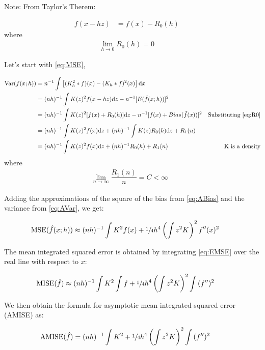 Note: From Taylor's Therem:

\begin{align}
f(x - hz) & = f(x) - R_0(h) && \label{eq:R0}
\end{align}
where 
\begin{align}
\lim_{h \to 0}{R_0(h)} = 0 && \nonumber
\end{align}


Let's start with \autoref{eq:MSE},

\begin{align}
\mbox{Var}(f(x;h)) & = n^{-1} \int{\left[\conv{K_h^2}{f}(x) - \conv{K_h}{f}^2(x)\right]\mathrm{d}x} && \nonumber \\
    & = (nh)^{-1} \int{K(z)^2f(x - hz)\mathrm{d}z} - n^{-1} [E(\hat{f}(x;h))]^2 && \nonumber \\
    & = (nh)^{-1} \int{K(z)^2[f(x) + R_0(h)]\mathrm{d}z} - n^{-1}[f(x) + Bias(\hat{f}(x))]^2 & \text{Substituting \autoref{eq:R0}} & \nonumber \\
    & = (nh)^{-1} \int{K(z)^2f(x)\mathrm{d}z} + (nh)^{-1} \int{K(z)R_0(h)\mathrm{d}z} + R_1(n) && \nonumber \\
    & = (nh)^{-1} \int{K(z)^2f(x)\mathrm{d}z} + (nh)^{-1} R_0(h) + R_1(n) & \text{K is a density} & \label{eq:AVar}
\end{align}
where
\begin{align}
\lim_{n \to \infty} \dfrac{R_1(n)}{n} = C < \infty & \nonumber
\end{align}

Adding the approximations of the square of the bias from \autoref{eq:ABias} and the variance from \autoref{eq:AVar}, we get:

\begin{align}
\mbox{MSE}(\hat{f}(x;h)) & \approx (nh)^{-1} \int{K^2}f(x) + \sfrac{1}{4}h^4\left(\int{z^2K}\right)^2f^{\prime\prime}(x)^2 && \label{eq:EMSE}
\end{align}

The mean integrated squared error is obtained by integrating \autoref{eq:EMSE} over the real line with respect to $x$:

\begin{align}
\mbox{MISE}(\hat{f}) & \approx (nh)^{-1} \int{K^2}\int{f} + \sfrac{1}{4}h^4\left(\int{z^2K}\right)^2 \int{ (f^{\prime\prime})^2 } && \label{eq:EMISE}
\end{align}

We then obtain the formula for asymptotic mean integrated squared error (AMISE) as:

\begin{align}
\mbox{AMISE}(\hat{f}) & = (nh)^{-1} \int{K^2} + \sfrac{1}{4}h^4\left(\int{z^2K}\right)^2 \int{ (f^{\prime\prime})^2 } && \label{eq:AMISE}
\end{align}

